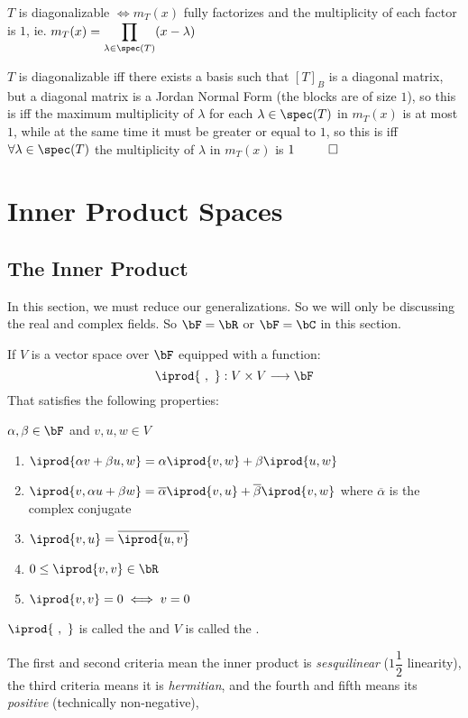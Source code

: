 \documentclass[10pt]{article}
\begin{document}
\begin{theorem}{$T$ is diagonalizable $\iff m_T(x)$ fully factorizes and the multiplicity of each factor is $1$, ie. $m_T(x)=\displaystyle\prod_{\lambda\in\spec(T)}(x-\lambda)$}

$T$ is diagonalizable iff there exists a basis such that $[T]_B$ is a diagonal matrix, but a diagonal matrix is a Jordan Normal Form (the blocks are of size $1$), so this is iff the maximum multiplicity of $\lambda$ for each $\lambda\in\spec(T)$ in $m_T(x)$ is at most $1$, while at the same time it must be greater or equal to $1$, so this is iff $\forall\lambda\in\spec(T)$ the multiplicity of $\lambda$ in $m_T(x)$ is $1 ~~ \qed$

\end{theorem}

\newpage
\section{Inner Product Spaces}

\subsection{The Inner Product}

In this section, we must reduce our generalizations. So we will only be discussing the real and complex fields. So $\bF=\bR$ or $\bF=\bC$ in this section.

\begin{definition*}

If $V$ is a vector space over $\bF$ equipped with a function:
\[ \iprod{~,~} : V\times V\longrightarrow\bF \]
That satisfies the following properties:

$\alpha,\beta\in\bF$ and $v,u,w\in V$
\begin{enumerate}
    \item $\iprod{\alpha v+\beta u, w} = \alpha\iprod{v,w}+\beta\iprod{u,w}$
    \item $\iprod{v,\alpha u+\beta w} = \overline{\alpha}\iprod{v,u}+\overline{\beta}\iprod{v,w}$ where $\overline{\alpha}$ is the complex conjugate
    \item $\iprod{v,u}=\overline{\iprod{u,v}}$
    \item $0\leq\iprod{v,v}\in\bR$
    \item $\iprod{v,v}=0\iff v=0$
\end{enumerate}

$\iprod{~,~}$ is called the  and $V$ is called the .

The first and second criteria mean the inner product is \textit{sesquilinear} ($1\dfrac{1}{2}$ linearity), the third criteria means it is \textit{hermitian}, and the fourth and fifth means its \textit{positive} (technically non-negative), 

\end{definition*}
\end{document}
